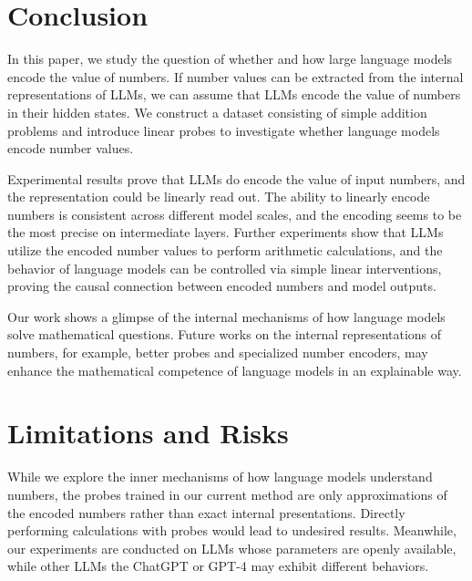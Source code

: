 \documentclass[11pt]{article}
\begin{document}
\section{Conclusion}
In this paper, we study the question of whether and how large language models encode the value of numbers.
If number values can be extracted from the internal representations of LLMs, we can assume that LLMs encode the value of numbers in their hidden states.
We construct a dataset consisting of simple addition problems and introduce linear probes to investigate whether language models encode number values.

Experimental results prove that LLMs do encode the value of input numbers, and the representation could be linearly read out.
The ability to linearly encode numbers is consistent across different model scales, and the encoding seems to be the most precise on intermediate layers.
Further experiments show that LLMs utilize the encoded number values to perform arithmetic calculations, and the behavior of language models can be controlled via simple linear interventions, proving the causal connection between encoded numbers and model outputs.

Our work shows a glimpse of the internal mechanisms of how language models solve mathematical questions.
Future works on the internal representations of numbers, for example, better probes and specialized number encoders, may enhance the mathematical competence of language models in an explainable way.

\section*{Limitations and Risks}
While we explore the inner mechanisms of how language models understand numbers, the probes trained in our current method are only approximations of the encoded numbers rather than exact internal presentations.
Directly performing calculations with probes would lead to undesired results.
Meanwhile, our experiments are conducted on LLMs whose parameters are openly available, while other LLMs the ChatGPT or GPT-4 may exhibit different behaviors. 


%


\appendix
\end{document}
